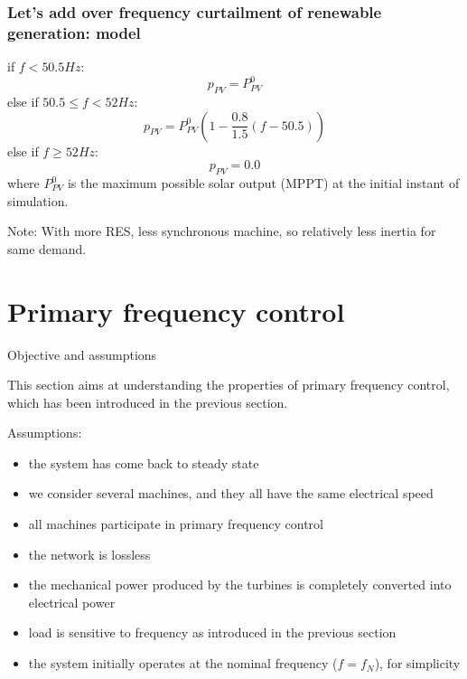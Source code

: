\begin{frame}
    \frametitle{Let's add over frequency curtailment of renewable generation: model}
    if $f < 50.5 Hz$:
    $$p_{PV} = P^0_{PV} $$
    else if $ 50.5 \leq f < 52 Hz$:
    $$p_{PV} = P^0_{PV} \left(1 - \frac{0.8}{1.5}(f-50.5)\right) $$
    else if $f \geq 52 Hz$:
    $$p_{PV} = 0.0$$
    where $P^0_{PV}$ is the maximum possible solar output (MPPT) at the initial instant of simulation.

    Note: With more RES, less synchronous machine, so relatively less inertia for same demand.
\end{frame}


\section{Primary frequency control}

\begin{frame}{Objective and assumptions}

    This section aims at understanding the properties of primary frequency control, which has been introduced in the previous section.

    Assumptions: 
    \begin{itemize}
      \item the system has come back to steady state 
      \item we consider several machines, and they all have the same electrical speed
      \item all machines participate in primary frequency control
      \item the network is lossless 
      \item the mechanical power produced by the turbines is completely converted into electrical power 
      \item load is sensitive to frequency as introduced in the previous section
      \item the system initially operates at the nominal frequency ($f = f_N$), for simplicity
    \end{itemize}
\end{frame}


